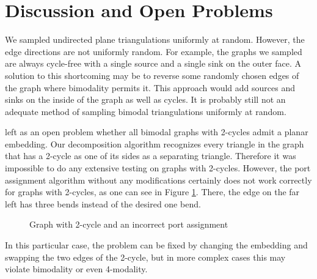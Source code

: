 \documentclass[a4paper]{article}
\newcommand\rectangle[4]{
    \draw (#1,#2) rectangle (#3,#4);
    \draw[dashed,gray] (#1,#2) -- (#3,#4);
    \draw[dashed,gray] (#1,#4) -- (#3,#2);
}
\begin{document}
\section{Discussion and Open Problems}\label{sec:end}
We sampled undirected plane triangulations uniformly at random.
However, the edge directions are not uniformly random.
For example, the graphs we sampled are always cycle-free with a single source
and a single sink on the outer face.
A solution to this shortcoming may be to reverse some randomly chosen edges of
the graph where bimodality permits it.
This approach would add sources and sinks on the inside of the graph as well as
cycles.
It is probably still not an adequate method of sampling bimodal triangulations
uniformly at random.

\citet{ldrawing} left as an open problem whether all bimodal graphs with 2-cycles
admit a planar embedding.
Our decomposition algorithm recognizes every triangle in the graph that has a
2-cycle as one of its sides as a separating triangle.
Therefore it was impossible to do any extensive testing on graphs with 2-cycles.
However, the port assignment algorithm without any modifications certainly does
not work correctly for
graphs with 2-cycles, as one can see in Figure \ref{fig:2cycle}.
There, the edge on the far left has three bends instead of the desired one bend.

\begin{figure}[ht]
    \center
    \qquad
    \caption{Graph with 2-cycle and an incorrect port assignment}
    \label{fig:2cycle}
\end{figure}

In this particular case, the problem can be fixed by changing the embedding and
swapping the two edges of
the 2-cycle, but in more complex cases this may violate bimodality or even
4-modality.



\end{document}
